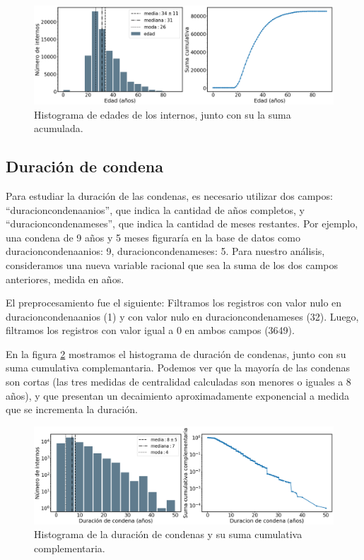 \documentclass[10pt]{article}
\begin{document}
\begin{figure}[H]
	\centering
	\includegraphics[scale=0.26]{graficos/edad.png}
	\caption{Histograma de edades de los internos, junto con su la suma acumulada. \label{fig:edad}}
\end{figure}

\subsection{Duración de condena}

Para estudiar la duraci\'on de las condenas, es necesario utilizar dos campos: ``duracion\textunderscore condena\textunderscore anios'', que indica la cantidad de a\~nos completos, y ``duracion\textunderscore  condena\textunderscore  meses'', que indica la cantidad de meses restantes. Por ejemplo, una condena de 9 a\~nos y 5 meses figurar\'ia en la base de datos como duracion\textunderscore  condena\textunderscore  anios: 9, duracion\textunderscore  condena\textunderscore  meses: 5. Para nuestro an\'alisis, consideramos una nueva variable racional que sea la suma de los dos campos anteriores, medida en a\~nos. 

El preprocesamiento fue el siguiente: Filtramos los registros con valor nulo en duracion\textunderscore condena\textunderscore anios (1) y con valor nulo en duracion\textunderscore condena\textunderscore meses (32). Luego, filtramos los registros con valor igual a 0 en ambos campos (3649).

En la figura \ref{fig:duracion_condena} mostramos el histograma de duraci\'on de condenas, junto con su suma cumulativa complemantaria. Podemos ver que la mayor\'ia de las condenas son cortas (las tres medidas de centralidad calculadas son menores o iguales a 8 a\~nos), y que presentan un decaimiento aproximadamente exponencial a medida que se incrementa la duraci\'on. 

\begin{figure}[H]
	\centering
	\includegraphics[scale=0.26]{graficos/duracion_condena.png}
	\caption{Histograma de la duraci\'on de condenas y su suma cumulativa complementaria. \label{fig:duracion_condena}}
\end{figure}
\end{document}

